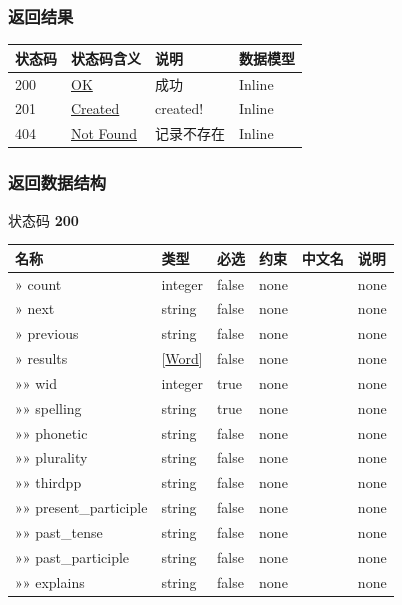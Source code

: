 \documentclass[
]{article}
\begin{document}
\hypertarget{ux8fd4ux56deux7ed3ux679c-1}{%
\subsubsection{返回结果}\label{ux8fd4ux56deux7ed3ux679c-1}}

\begin{longtable}[]{@{}llll@{}}
\toprule
状态码 & 状态码含义 & 说明 & 数据模型 \\
\midrule
\endhead
200 & \href{https://tools.ietf.org/html/rfc7231\#section-6.3.1}{OK} &
成功 & Inline \\
201 & \href{https://tools.ietf.org/html/rfc7231\#section-6.3.2}{Created}
& created! & Inline \\
404 & \href{https://tools.ietf.org/html/rfc7231\#section-6.5.4}{Not
Found} & 记录不存在 & Inline \\
\bottomrule
\end{longtable}

\hypertarget{ux8fd4ux56deux6570ux636eux7ed3ux6784-1}{%
\subsubsection{返回数据结构}\label{ux8fd4ux56deux6570ux636eux7ed3ux6784-1}}

状态码 \textbf{200}

\begin{longtable}[]{@{}llllll@{}}
\toprule
名称 & 类型 & 必选 & 约束 & 中文名 & 说明 \\
\midrule
\endhead
» count & integer & false & none & & none \\
» next & string & false & none & & none \\
» previous & string & false & none & & none \\
» results & {[}\protect\hyperlink{schemaword}{Word}{]} & false & none &
& none \\
»» wid & integer & true & none & & none \\
»» spelling & string & true & none & & none \\
»» phonetic & string & false & none & & none \\
»» plurality & string & false & none & & none \\
»» thirdpp & string & false & none & & none \\
»» present\_participle & string & false & none & & none \\
»» past\_tense & string & false & none & & none \\
»» past\_participle & string & false & none & & none \\
»» explains & string & false & none & & none \\
\bottomrule
\end{longtable}
\end{document}
